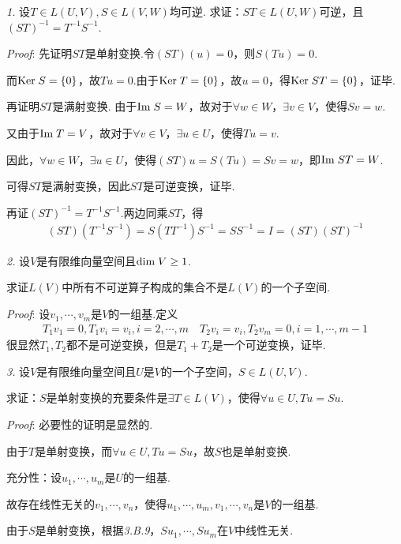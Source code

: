 \textit{1.}
设$T \in L(U,V),S \in L(V,W)$均可逆.
求证：$ST \in L(U,W)$可逆，且$(ST)^{-1}=T^{-1}S^{-1}$.

\textit{Proof}:
先证明$ST$是单射变换.令$(ST)(u)=0$，则$S(Tu)=0$.

而$\mathrm{Ker \;} S=\{0\}$，故$Tu=0$.由于$\mathrm{Ker \;} T=\{0\}$，故$u=0$，得$\mathrm{Ker \;} ST=\{0\}$，证毕.

再证明$ST$是满射变换.
由于$\mathrm{Im \;} S=W$，故对于$\forall w \in W$，$\exists v \in V$，使得$Sv=w$.

又由于$\mathrm{Im \;} T=V$，故对于$\forall v \in V$，$\exists u \in U$，使得$Tu=v$.

因此，$\forall w \in W$，$\exists u \in U$，使得$(ST)u=S(Tu)=Sv=w$，即$\mathrm{Im \;} ST=W$.

可得$ST$是满射变换，因此$ST$是可逆变换，证毕.

再证$(ST)^{-1}=T^{-1}S^{-1}$.两边同乘$ST$，得
    \begin{align*}
        (ST)(T^{-1}S^{-1})=S(TT^{-1})S^{-1}=SS^{-1}=I=(ST)(ST)^{-1}
    \end{align*}

\hspace*{\fill}

\textit{2.}
设$V$是有限维向量空间且$\mathrm{dim \;} V \geq 1$.

求证$L(V)$中所有不可逆算子构成的集合不是$L(V)$的一个子空间.

\textit{Proof}:
设$v_1,\cdots,v_m$是$V$的一组基.定义
    \begin{align*}
        T_1v_1=0,T_1v_i=v_i,i=2,\cdots,m \quad
        T_2v_i=v_i,T_2v_m=0,i=1,\cdots,m-1
    \end{align*}
很显然$T_1,T_2$都不是可逆变换，但是$T_1+T_2$是一个可逆变换，证毕.

\hspace*{\fill}

\textit{3.}
设$V$是有限维向量空间且$U$是$V$的一个子空间，$S \in L(U,V)$.

求证：$S$是单射变换的充要条件是$\exists T \in L(V)$，使得$\forall u \in U,Tu=Su$.

\textit{Proof}:
必要性的证明是显然的.

由于$T$是单射变换，而$\forall u \in U,Tu=Su$，故$S$也是单射变换.

充分性：设$u_1,\cdots,u_m$是$U$的一组基.

故存在线性无关的$v_1,\cdots,v_n$，使得$u_1,\cdots,u_m,v_1,\cdots,v_n$是$V$的一组基.

由于$S$是单射变换，根据\textit{3.B.9}，$Su_1,\cdots,Su_m$在$V$中线性无关.

